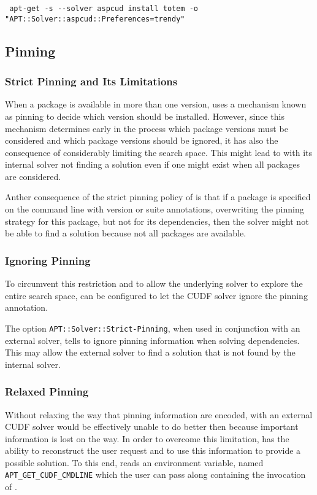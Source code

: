 \begin{verbatim}
 apt-get -s --solver aspcud install totem -o "APT::Solver::aspcud::Preferences=trendy"
\end{verbatim}

\subsection{Pinning}

\subsubsection{Strict Pinning and Its Limitations}
When a package is available in more than one version, \aptget{} uses a
mechanism known as pinning to decide which version should be
installed. However, since this mechanism determines early in the
process which package versions must be considered and which package
versions should be ignored, it has also the consequence of
considerably limiting the search space. This might lead to \aptget{}
with its internal solver not finding a solution even if one might
exist when all packages are considered.

Anther consequence of the strict pinning policy of \aptget{} is that
if a package is specified on the command line with version or suite
annotations, overwriting the pinning strategy for this package, but
not for its dependencies, then the solver might not be able to
find a solution because not all packages are available. 

\subsubsection{Ignoring Pinning}
To circumvent this restriction and to allow the underlying solver to
explore the entire search space, \aptget{} can be configured to let the
CUDF solver ignore the pinning annotation.

The option \texttt{APT::Solver::Strict-Pinning}, when used in
conjunction with an external solver, tells \aptget{} to ignore pinning
information when solving dependencies. This may allow the external
solver to find a solution that is not found by the \aptget{}
internal solver.

\subsubsection{Relaxed Pinning}
Without relaxing the way that pinning information are encoded,
\aptcudf{} with an external CUDF solver would be effectively unable to
do better then \aptget{} because important information is lost on the
way. In order to overcome this limitation, \aptcudf{} has the ability
to reconstruct the user request and to use this information to provide
a possible solution. To this end, \aptcudf{} reads an environment
variable, named \texttt{APT\_GET\_CUDF\_CMDLINE} which the user can
pass along containing the invocation of \aptget.

